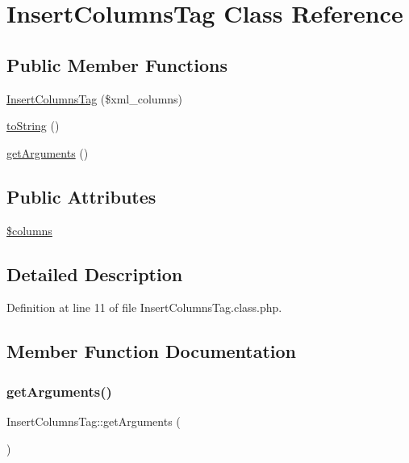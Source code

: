 \hypertarget{classInsertColumnsTag}{}\section{Insert\+Columns\+Tag Class Reference}
\label{classInsertColumnsTag}
\subsection*{Public Member Functions}
\begin{DoxyCompactItemize}
\item 
\hyperlink{classInsertColumnsTag_a4d414adeb3714b646e7a55fc6b446c2c}{Insert\+Columns\+Tag} (\$xml\+\_\+columns)
\item 
\hyperlink{classInsertColumnsTag_aa18eef08112bb20ab2d77b26270e40ea}{to\+String} ()
\item 
\hyperlink{classInsertColumnsTag_ae6cb8af5c32b1c3dbb727a4322767536}{get\+Arguments} ()
\end{DoxyCompactItemize}
\subsection*{Public Attributes}
\begin{DoxyCompactItemize}
\item 
\hyperlink{classInsertColumnsTag_a430ddaff2f1eeced25e580a8e714f2e4}{\$columns}
\end{DoxyCompactItemize}


\subsection{Detailed Description}


Definition at line 11 of file Insert\+Columns\+Tag.\+class.\+php.



\subsection{Member Function Documentation}
\mbox{\label{classInsertColumnsTag_ae6cb8af5c32b1c3dbb727a4322767536}} 
\subsubsection{\texorpdfstring{get\+Arguments()}{getArguments()}}
{\footnotesize\ttfamily Insert\+Columns\+Tag\+::get\+Arguments (\begin{DoxyParamCaption}{ }\end{DoxyParamCaption})}

